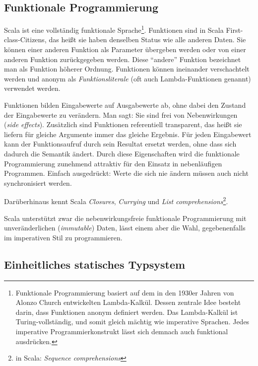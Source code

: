 \documentclass[a4paper, 12pt, hidelinks, listof=totoc, listoftables=totoc, bibliography=totoc]{scrreprt}
\begin{document}
\subsection{Funktionale Programmierung}


Scala ist eine vollständig funktionale Sprache\footnote{Funktionale Programmierung basiert auf dem in den 1930er Jahren von Alonzo Church entwickelten Lambda-Kalkül. Dessen zentrale Idee besteht darin, dass Funktionen anonym definiert werden. Das Lambda-Kalkül ist Turing-vollständig, und somit gleich mächtig wie imperative Sprachen. Jedes imperative Programmierkonstrukt lässt sich demnach auch funktional ausdrücken.}. Funktionen sind in Scala First-class-Citizens, das heißt sie haben denselben Status wie alle anderen Daten. Sie können einer anderen Funktion als Parameter übergeben werden oder von einer anderen Funktion zurückgegeben werden. Diese "`andere"' Funktion bezeichnet man als Funktion höherer Ordnung. Funktionen können ineinander verschachtelt werden und anonym als \emph{Funktionsliterale} (oft auch Lambda-Funktionen genannt) verwendet werden.

Funktionen bilden Eingabewerte auf Ausgabewerte ab, ohne dabei den Zustand der Eingabewerte zu verändern. Man sagt: Sie sind frei von Nebenwirkungen (\emph{side effects}). Zusätzlich sind Funktionen referentiell transparent, das heißt sie liefern für gleiche Argumente immer das gleiche Ergebnis. Für jeden Eingabewert kann der Funktionsaufruf durch sein Resultat ersetzt werden, ohne dass sich dadurch die Semantik ändert. Durch diese Eigenschaften wird die funktionale Programmierung zunehmend attraktiv für den Einsatz in nebenläufigen Programmen. Einfach ausgedrückt: Werte die sich nie ändern müssen auch nicht synchronisiert werden.

Darüberhinaus kennt Scala \emph{Closures}, \emph{Currying} und \emph{List comprehensions}\footnote{in Scala: \emph{Sequence comprehensions}}.

Scala unterstützt zwar die nebenwirkungsfreie funktionale Programmierung mit unveränderlichen (\emph{immutable}) Daten, lässt einem aber die Wahl, gegebenenfalls im imperativen Stil zu programmieren.\cite[S. 6 ff.]{piepmeyer2010.GFP}\cite[S. 10 ff.]{odersky2008.PIS}

\subsection{Einheitliches statisches Typsystem}\label{subsec:scala-types}
\end{document}
